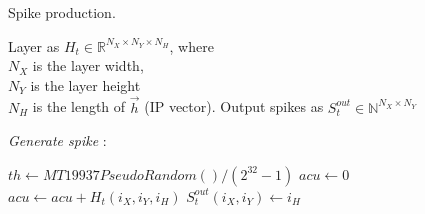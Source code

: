 \begin{algorithm}[h!]
	\label{alg:spike}
	\caption{Spike production.}
	
	\begin{algorithmic}[1]
		\SetAlgoLined
		\renewcommand{\algorithmicrequire}{\textbf{input:}}
		\renewcommand{\algorithmicensure}{\textbf{output:}}
		\REQUIRE Layer as $H_t\in\mathbb{R}^{N_X \times N_Y \times N_H}$, where\\
		$N_X$ is the layer width,\\
		$N_Y$ is the layer height\\
		$N_H$ is the length of $\vec{h}$ (IP vector).
		\ENSURE Output spikes as $S_t^{out} \in\mathbb{N}^{N_X \times N_Y}$
		
			

			\textit{Generate spike} :
			
			\STATE $th \leftarrow MT19937PseudoRandom()/(2^{32}-1)$
			\STATE $acu \leftarrow 0$
				\STATE $acu \leftarrow acu + H_t(i_X,i_Y,i_{H})$
					\STATE $S_t^{out}(i_X,i_Y) \leftarrow i_{H}$
				\ENDIF
			\ENDFOR
		\ENDFOR
	\end{algorithmic} 
\end{algorithm}





